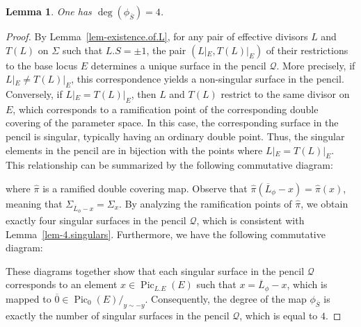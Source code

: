 \documentclass[10pt,a4paper]{article}
\numberwithin{equation}{section}
\theoremstyle{definition}
\theoremstyle{plain}
\newtheorem{lemma}[definition]{Lemma}
\theoremstyle{remark}
\DeclareMathOperator{\Pic}{Pic}
\begin{document}
\begin{lemma}\label{lem-degree.phi(S)}
 One has $\deg (\phi_{\overline{S}})= 4$.
\end{lemma}

\begin{proof} 
  By Lemma~\ref{lem-existence.of.L}, for any pair of effective divisors $L$ and $T(L)$ on $\Sigma$ such that $L.S= \pm 1$, the pair $(L|_E, T(L)|_E)$  of their restrictions to the base locus $E$ determines a unique surface in the pencil $\mathcal{Q}$.  More precisely, if $L|_E \neq T(L)|_E$, this correspondence yields a non-singular surface in the pencil. Conversely, if $L|_E = T(L)|_E$, then $L$ and $T(L)$ restrict to the same divisor on $E$, which corresponds to a ramification point of the corresponding double covering of the parameter space. In this case, the corresponding surface in the pencil is singular, typically having an ordinary double point. Thus, the singular elements in the pencil are in bijection with the points where $L|_E = T(L)|_E$.  This relationship can be summarized by the following commutative diagram:
\begin{center}
\end{center}
where $\hat{\pi}$ is a  ramified double covering map. Observe that $\hat{\pi}(\overline{L}_{\phi}-x)=\hat{\pi}(x)$, meaning that $\Sigma_{\overline{L}_{\phi}-x}=\Sigma_x$.
By analyzing the ramification points of $\hat{\pi}$, we obtain exactly four singular surfaces in the pencil $\mathcal{Q}$, which is consistent with Lemma~\ref{lem-4.singulars}. Furthermore, we have the following commutative diagram:
\begin{center}
\end{center}

These diagrams together show that  each singular surface in the pencil $\mathcal{Q}$ corresponds to an element $x\in \Pic_{L.E}(E)$ such that $x=\overline{L}_{\phi}-x$, which is mapped to $\overline{0}\in \Pic_0(E)/_{y\sim -y}$. Consequently, the degree of the map $\phi_{\overline{S}}$  is exactly the number of singular surfaces in the pencil $\mathcal{Q}$, which is equal to $4$.
\end{proof}
\end{document}
